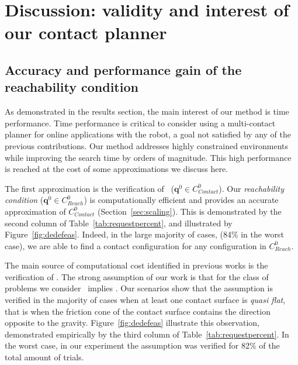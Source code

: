  \section{Discussion: validity and interest of our contact planner} 
\label{sec:discussion}

\subsection{Accuracy and performance gain of the reachability condition}

As demonstrated in the results section, the main interest of our method is time performance. Time performance is critical to consider using a multi-contact planner for 
online applications with the robot, a goal not satisfied by any of the previous contributions. Our method addresses highly constrained environments while improving the search time by orders of magnitude. This high performance is reached at the cost of some approximations we discuss here. 

The first approximation is the verification of \contactreachability\ ($\mathbf{q}^0 \in C_{Contact}^0$).  Our \textit{reachability condition} ($\mathbf{q}^0 \in C_{Reach}^0$) is computationally efficient and provides an accurate approximation of $C_{Contact}^0$ (Section~\ref{sec:scaling}). This is demonstrated by the second column of Table~\ref{tab:requestpercent}, and illustrated by Figure~\ref{fig:dedefeas}. Indeed, in the large majority of cases, (84\% in the worst case), we are able to find a contact configuration for any configuration in $C_{Reach}^0$.


The main source of computational cost identified in previous works is the verification of \equilibriumfeasibility. 
The strong assumption of our work is that for the class of problems we consider \contactreachability\ implies \equilibriumfeasibility.
Our scenarios show that the  assumption is verified in the majority of cases when at least one contact surface is \textit{quasi flat}, that is when
the friction cone of the contact surface contains the direction opposite to the gravity.
Figure~\ref{fig:dedefeas} illustrate this observation, demonstrated empirically by the third column of Table~\ref{tab:requestpercent}. In the worst case, in our experiment
the assumption was verified for 82\% of the total amount of trials.

